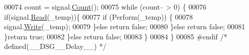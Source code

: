 \begin{DoxyCode}
00074             count = signal.\hyperlink{class_d_s_g_1_1_ring_buffer_a9bd79b0a6dff618b205e396c101ee070}{Count}();
00075             \textcolor{keywordflow}{while} (count-- > 0) \{
00076                 \textcolor{keywordflow}{if}(signal.\hyperlink{class_d_s_g_1_1_ring_buffer_a6b2848a64f15c7b0c320779582fa0fbe}{Read}(\_temp))\{
00077                     \textcolor{keywordflow}{if} (Perform(\_temp)) \{
00078                         signal.\hyperlink{class_d_s_g_1_1_ring_buffer_aa5dd2caa0a270173251faee40a43d692}{Write}(\_temp);
00079                     \}\textcolor{keywordflow}{else} \textcolor{keywordflow}{return} \textcolor{keyword}{false};
00080                 \}\textcolor{keywordflow}{else} \textcolor{keywordflow}{return} \textcolor{keyword}{false};
00081             \}\textcolor{keywordflow}{return} \textcolor{keyword}{true};
00082         \}\textcolor{keywordflow}{else} \textcolor{keywordflow}{return} \textcolor{keyword}{false};
00083     \}
00084 \}
00085 \textcolor{preprocessor}{#endif }\textcolor{comment}{/* defined(\_\_DSG\_\_Delay\_\_) */}\textcolor{preprocessor}{}
\end{DoxyCode}
